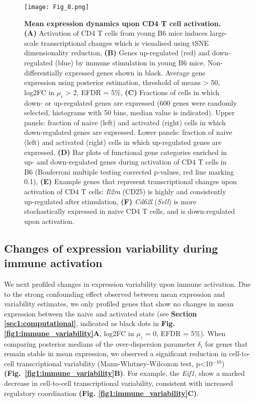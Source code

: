 \begin{figure}[!ht]
\centering
\texttt{[image: Fig\_8.png]}
\caption[Mean expression dynamics upon CD4\plus{} T cell activation]{\textbf{Mean expression dynamics upon CD4\plus{} T cell activation.}\\
\textbf{(A)} Activation of CD4\plus{} T cells from young B6 mice induces large-scale transcriptional changes which is visualised using tSNE dimensionality reduction, \textbf{(B)} Genes up-regulated (red) and down-regulated (blue) by immune stimulation in young B6 mice. Non-differentially expressed genes shown in black. Average gene expression using posterior estimation, threshold of means > 50, log2FC in $\mu_i$ > 2, EFDR = 5\%, \textbf{(C)} Fractions of cells in which down- or up-regulated genes are expressed (600 genes were randomly selected, histograms with 50 bins, median value is indicated). Upper panels: fraction of naive (left) and activated (right) cells in which down-regulated genes are expressed. Lower panels: fraction of naive (left) and activated (right) cells in which up-regulated genes are expressed, \textbf{(D)} Bar plots of functional gene categories enriched in up- and down-regulated genes during activation of CD4\plus{} T cells in B6 (Bonferroni multiple testing corrected p-values, red line marking 0.1), \textbf{(E)} Example genes that represent transcriptional changes upon activation of CD4\plus{} T cells: \textit{Il2ra} (CD25) is highly and consistently up-regulated after stimulation, \textbf{(F)} \textit{Cd62l} (\textit{Sell}) is more stochastically expressed in naive CD4\plus{} T cells, and is down-regulated upon activation.
}
\label{fig1:immune_activation}
\end{figure}

\newpage

\subsection{Changes of expression variability during immune activation}

We next profiled changes in expression variability upon immune activation. Due to the strong confounding effect observed between mean expression and variability estimates, we only profiled genes that show no changes in mean expression between the naive and activated state (see \textbf{Section \ref{sec1:computational}}, indicated as black dots in \textbf{Fig. \ref{fig1:immune_variability}A}, log2FC in $\mu_i$ = 0, EFDR = 5\%). When comparing posterior medians of the over-dispersion parameter $\delta_i$ for genes that remain stable in mean expression, we observed a significant reduction in cell-to-cell transcriptional variability (Mann-Whitney-Wilcoxon test, p<10$^{-10}$) \textbf{(Fig.~\ref{fig1:immune_variability}B)}. For example, the \textit{\gls{Eif1}}, show a marked decrease in cell-to-cell transcriptional variability, consistent with increased regulatory coordination \textbf{(Fig. \ref{fig1:immune_variability}C)}.\\

